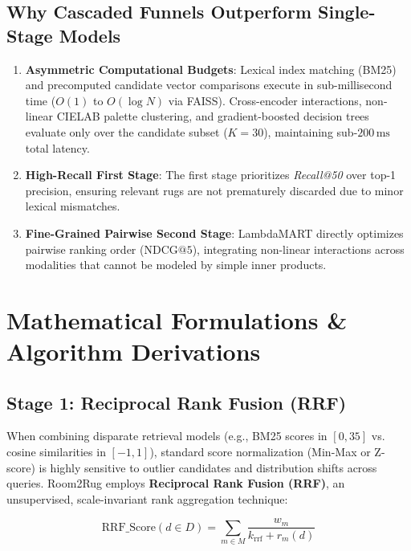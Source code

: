 \documentclass[11pt,a4paper]{article}
\begin{document}
\vspace{1em}

\subsection{Why Cascaded Funnels Outperform Single-Stage Models}
\begin{enumerate}[leftmargin=*]
    \item \textbf{Asymmetric Computational Budgets}: Lexical index matching (BM25) and precomputed candidate vector comparisons execute in sub-millisecond time ($O(1)$ to $O(\log N)$ via FAISS). Cross-encoder interactions, non-linear CIELAB palette clustering, and gradient-boosted decision trees evaluate only over the candidate subset ($K=30$), maintaining sub-$200\,\text{ms}$ total latency.
    \item \textbf{High-Recall First Stage}: The first stage prioritizes \textit{Recall@50} over top-1 precision, ensuring relevant rugs are not prematurely discarded due to minor lexical mismatches.
    \item \textbf{Fine-Grained Pairwise Second Stage}: LambdaMART directly optimizes pairwise ranking order ($\text{NDCG}@5$), integrating non-linear interactions across modalities that cannot be modeled by simple inner products.
\end{enumerate}

\section{Mathematical Formulations \& Algorithm Derivations}

\subsection{Stage 1: Reciprocal Rank Fusion (RRF)}
When combining disparate retrieval models (e.g., BM25 scores in $[0, 35]$ vs. cosine similarities in $[-1, 1]$), standard score normalization (Min-Max or Z-score) is highly sensitive to outlier candidates and distribution shifts across queries. Room2Rug employs \textbf{Reciprocal Rank Fusion (RRF)}, an unsupervised, scale-invariant rank aggregation technique:

\begin{equation}
\text{RRF\_Score}(d \in D) = \sum_{m \in M} \frac{w_m}{k_{\text{rrf}} + r_m(d)}
\end{equation}
\end{document}
